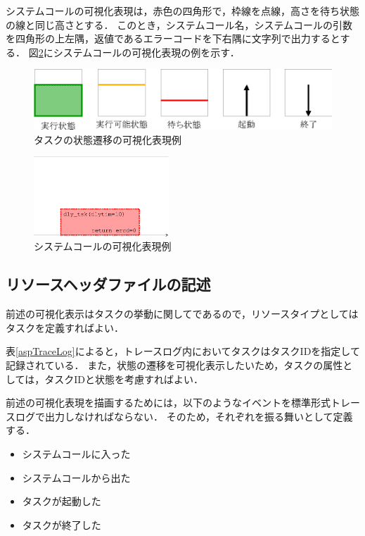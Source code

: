 システムコールの可視化表現は，赤色の四角形で，枠線を点線，高さを待ち状態の線と同じ高さとする．
このとき，システムコール名，システムコールの引数を四角形の上左隅，返値であるエラーコードを下右隅に文字列で出力するとする．
図\ref{fig:svcCallVisual}にシステムコールの可視化表現の例を示す．

\begin{figure}[t]
\begin{center}
\includegraphics[scale=0.75]{img/taskStateChangeVisual.eps}
\caption{タスクの状態遷移の可視化表現例}
\label{fig:taskStateChangeVisual}
\end{center}
\end{figure}

\begin{figure}[t]
\begin{center}
\includegraphics[height=3cm]{img/svcCallVisual.eps}
\caption{システムコールの可視化表現例}
\label{fig:svcCallVisual}
\end{center}
\end{figure}

\subsection{リソースヘッダファイルの記述}

前述の可視化表示はタスクの挙動に関してであるので，リソースタイプとしてはタスクを定義すればよい．

表\ref{aspTraceLog}によると，トレースログ内においてタスクはタスクIDを指定して記録されている．
また，状態の遷移を可視化表示したいため，タスクの属性としては，タスクIDと状態を考慮すればよい．

前述の可視化表現を描画するためには，以下のようなイベントを標準形式トレースログで出力しなければならない．
そのため，それぞれを振る舞いとして定義する．

\begin{itemize}
\setlength{\itemsep}{-2mm}
\item システムコールに入った
\item システムコールから出た
\item タスクが起動した
\item タスクが終了した
\end{itemize}


